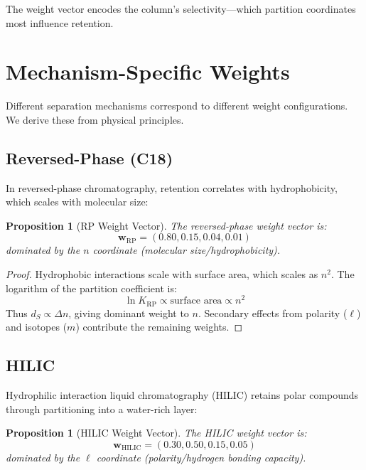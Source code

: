 \documentclass[twocolumn,10pt]{article}
\newtheorem{proposition}[theorem]{Proposition}
\begin{document}
The weight vector encodes the column's selectivity---which partition coordinates most influence retention.

\section{Mechanism-Specific Weights}
\label{sec:mechanisms}

Different separation mechanisms correspond to different weight configurations. We derive these from physical principles.

\subsection{Reversed-Phase (C18)}

In reversed-phase chromatography, retention correlates with hydrophobicity, which scales with molecular size:

\begin{proposition}[RP Weight Vector]
\label{prop:rp}
The reversed-phase weight vector is:
\begin{equation}
\mathbf{w}_{\text{RP}} = (0.80, 0.15, 0.04, 0.01)
\end{equation}
dominated by the $n$ coordinate (molecular size/hydrophobicity).
\end{proposition}

\begin{proof}
Hydrophobic interactions scale with surface area, which scales as $n^2$. The logarithm of the partition coefficient is:
\begin{equation}
\ln K_{\text{RP}} \propto \text{surface area} \propto n^2
\end{equation}
Thus $d_S \propto \Delta n$, giving dominant weight to $n$. Secondary effects from polarity ($\ell$) and isotopes ($m$) contribute the remaining weights.
\end{proof}

\subsection{HILIC}

Hydrophilic interaction liquid chromatography (HILIC) retains polar compounds through partitioning into a water-rich layer:

\begin{proposition}[HILIC Weight Vector]
\label{prop:hilic}
The HILIC weight vector is:
\begin{equation}
\mathbf{w}_{\text{HILIC}} = (0.30, 0.50, 0.15, 0.05)
\end{equation}
dominated by the $\ell$ coordinate (polarity/hydrogen bonding capacity).
\end{proposition}
\end{document}
